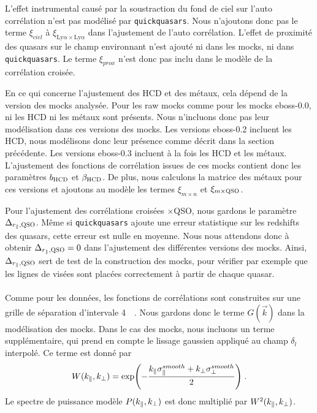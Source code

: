 \documentclass[11pt, twoside, a4paper, openright]{report}
\begin{document}
L'effet instrumental causé par la soustraction du fond de ciel sur l'auto corrélation n'est pas modélisé par \texttt{quickquasars}. Nous n'ajoutons donc pas le terme $\xi_{ciel}$ à $\xi_{\mathrm{Ly}\alpha\times\mathrm{Ly}\alpha}$ dans l'ajustement de l'auto corrélation.
L'effet de proximité des quasars sur le champ \lya{} environnant n'est ajouté ni dans les mocks, ni dans \texttt{quickquasars}. Le terme
$\xi_{prox}$ n'est donc pas inclu dans le modèle de la corrélation croisée.

En ce qui concerne l'ajustement des HCD et des métaux, cela dépend de la version des mocks analysée.
Pour les raw mocks comme pour les mocks eboss-0.0, ni les HCD ni les métaux sont présents. Nous n'incluons donc pas leur modélisation dans ces versions des mocks.
Les versions eboss-0.2 incluent les HCD, nous modélisons donc leur présence comme décrit dans la section précédente.
Les versions eboss-0.3 incluent à la fois les HCD et les métaux. L'ajustement des fonctions de corrélation issues de ces mocks contient donc les paramètres $b_{\textsc{HCD}}$ et $\beta_{\textsc{HCD}}$. De plus, nous calculons la matrice des métaux pour ces versions et ajoutons au modèle les termes $\xi_{m\times n}$ et $\xi_{m\times \textsc{QSO}}$.

Pour l'ajustement des corrélations croisées \lya{}$\times$QSO, nous gardons le paramètre $\Delta_{r_{\parallel}{}, \textsc{QSO}}$. Même si \texttt{quickquasars} ajoute une erreur statistique sur les redshifts des quasars, cette erreur est nulle en moyenne. Nous nous attendons donc à obtenir $\Delta_{r_{\parallel}{}, \textsc{QSO}} = 0$ dans l'ajustement des différentes versions des mocks. Ainsi, $\Delta_{r_{\parallel}{}, \textsc{QSO}}$ sert de test de la construction des mocks, pour vérifier par exemple que les lignes de visées sont placées correctement à partir de chaque quasar.

\paragraph{}
Comme pour les données, les fonctions de corrélations sont construites sur une grille de séparation d'intervale \SI{4}{\perh\Mpc}. Nous gardons donc le terme $G(\vec k)$ dans la modélisation des mocks.
Dans le cas des mocks, nous incluons un terme supplémentaire, qui prend en compte le lissage gaussien appliqué au champ $\delta_l$ interpolé. Ce terme est donné par
\begin{equation}
  W(k_{\parallel}{}, k_{\perp}{}) = \exp(- \frac{k_{\parallel}{} \sigma^{smooth}_{\parallel} + k_{\perp}{} \sigma^{smooth}_{\perp}}{2}) \; .
\end{equation}
Le spectre de puissance modèle $P(k_{\parallel}{}, k_{\perp}{})$ est donc multiplié par $W^2(k_{\parallel}{}, k_{\perp}{})$.
\end{document}
